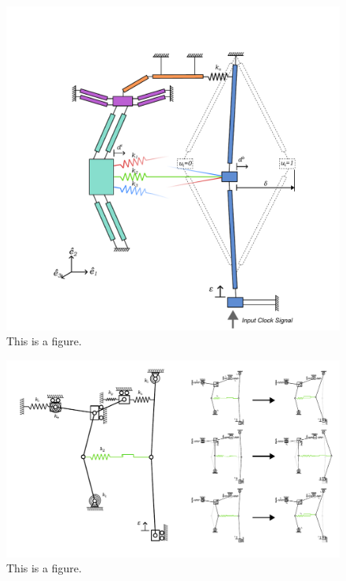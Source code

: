 \begin{figure}[h]
    \centering
    \includegraphics[width=\textwidth]{images/SVGs/PRBM.pdf}
    \caption{This is a figure.}
    \label{fig:Mechanism}
\end{figure}

\begin{figure}[h]
    \centering
    \includegraphics[width=\textwidth]{images/SVGs/Bifurcation_and_PRBM.pdf}
    \caption{This is a figure.}
    \label{fig:Bifurcation}
\end{figure}

